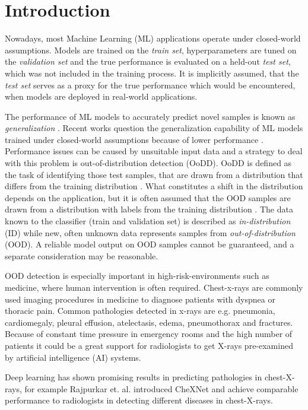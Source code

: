 \section{Introduction}
\raggedbottom
Nowadays, most Machine Learning (ML) applications operate under closed-world assumptions.
Models are trained on the \textit{train set}, hyperparameters are tuned on the \textit{validation set} and the true performance is evaluated on a held-out \textit{test set}, which was not included in the training process.
It is implicitly assumed, that the \textit{test set} serves as a proxy for the true performance which would be encountered, when models are deployed in real-world applications.
\par
The performance of ML models to accurately predict novel samples is known as \textit{generalization} \citep{Bishop2006}.
Recent works question the generalization capability of ML models trained under closed-world assumptions because of lower performance \citep{Recht2018,Zech2018}.
Performance issues can be caused by unsuitable input data and a strategy to deal with this problem is out-of-distribution detection (OoDD).
OoDD is defined as the task of identifying those test samples, that are drawn from a distribution that differs from the training distribution \citep{Yang2021}.
What constitutes a shift in the distribution depends on the application, but it is often assumed that the OOD samples are drawn from a distribution with labels from the training distribution \citep{Yang2021}.
The data known to the classifier (train and validation set) is described as \textit{in-distribution} (ID) while new, often unknown data represents samples from \textit{out-of-distribution} (OOD).
A reliable model output on OOD samples cannot be guaranteed, and a separate consideration may be reasonable.
\par
OOD detection is especially important in high-risk-environments such as medicine, where human intervention is often required.
Chest-x-rays are commonly used imaging procedures in medicine to diagnose patients with dyspnea or thoracic pain.
Common pathologies detected in x-rays are e.g. pneumonia, cardiomegaly, pleural effusion, atelectasis, edema, pneumothorax and fractures. 
Because of constant time pressure in emergency rooms and the high number of patients it could be a great support for radiologists to get X-rays pre-examined by artificial intelligence (AI) systems.
\par
Deep learning has shown promising results in predicting pathologies in chest-X-rays, for example Rajpurkar et. al. \citep{Rajpurkar2017} introduced CheXNet and achieve comparable performance to radiologists in detecting different diseases in chest-X-rays.

